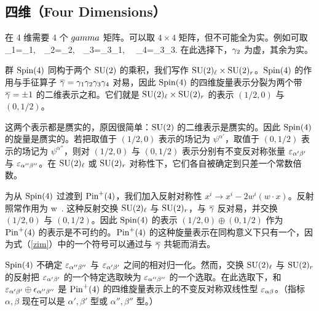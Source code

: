 
\subsection{四维（Four Dimensions）}\label{fwod}

在 4 维需要 4 个 $\\gamma$ 矩阵。可以取 $4\times 4$ 矩阵，但不可能全为实。例如可取
\be\label{dorf}\g_1=\sigma_1,~~\g_2=\sigma_2,~~\g_3=\sigma_3\otimes \sigma_1, ~~\g_4=\sigma_3\otimes \sigma_3.\ee
在此选择下，${\gamma}_2$ 为虚，其余为实。

群 ${\mathrm{Spin}}(4)$ 同构于两个 ${\mathrm{SU}}(2)$ 的乘积，我们写作 ${\mathrm{SU}}(2)_\ell\times {\mathrm{SU}}(2)_r$。${\mathrm{Spin}}(4)$ 的作用与手征算子 ${\overline\gamma}={\gamma}_1{\gamma}_2{\gamma}_3{\gamma}_4$ 对易，因此 ${\mathrm{Spin}}(4)$ 的四维旋量表示分裂为两个带 ${\overline\gamma}=\pm 1$ 的二维表示之和。它们就是 ${\mathrm{SU}}(2)_\ell\times {\mathrm{SU}}(2)_r$ 的表示 $(1/2,0)$ 与 $(0,1/2)$。

这两个表示都是赝实的，原因很简单：${\mathrm{SU}}(2)$ 的二维表示是赝实的。因此 ${\mathrm{Spin}}(4)$ 的旋量是赝实的。若把取值于 $(1/2,0)$ 表示的场记为 $\psi^{\alpha'}$，取值于 $(0,1/2)$ 表示的场记为 $\psi^{\alpha''}$，则对 $(1/2,0)$ 与 $(0,1/2)$ 表示分别有不变反对称张量 $\varepsilon_{\alpha'\beta'}$ 与 $\varepsilon_{\alpha''\beta''}$。在 ${\mathrm{SU}}(2)_\ell$ 或 ${\mathrm{SU}}(2)_r$ 对称性下，它们各自被确定到只差一个常数倍数。

为从 ${\mathrm{Spin}}(4)$ 过渡到 ${\mathrm{Pin}}^+(4)$，我们加入反射对称性 $x^i\to x^i-2w^i(w\cdot x)$。反射照常作用为
\be\label{zim}\psi\to \gamma\cdot w \,\psi.\ee
这种反射交换 ${\mathrm{SU}}(2)_\ell$ 与 ${\mathrm{SU}}(2)_r$，与 ${\overline\gamma}$ 反对易，并交换 $(1/2,0)$ 与 $(0,1/2)$。因此 ${\mathrm{Spin}}(4)$ 的表示 $(1/2,0)\oplus (0,1/2)$ 作为 ${\mathrm{Pin}}^+(4)$ 的表示是不可约的。${\mathrm{Pin}}^+(4)$ 的这种旋量表示在同构意义下只有一个，因为式（\ref{zim}）中的一个符号可以通过与 ${\overline\gamma}$ 共轭而消去。

${\mathrm{Spin}}(4)$ 不确定 $\varepsilon_{\alpha''\beta''}$ 与 $\varepsilon_{\alpha'\beta'}$ 之间的相对归一化。然而，交换 ${\mathrm{SU}}(2)_\ell$ 与 ${\mathrm{SU}}(2)_r$ 的反射把 $\varepsilon_{\alpha'\beta'}$ 的一个特定选取映为 $\varepsilon_{\alpha''\beta''}$ 的一个选取。在此选取下，和 $\varepsilon_{\alpha'\beta'}\oplus \epsilon_{\alpha''\beta''}$ 是 ${\mathrm{Pin}}^+(4)$ 的四维旋量表示上的不变反对称双线性型 $\varepsilon_{\alpha\beta}$。（指标 $\alpha,\beta$ 现在可以是 $\alpha',\beta'$ 型或 $\alpha'',\beta''$ 型。）

